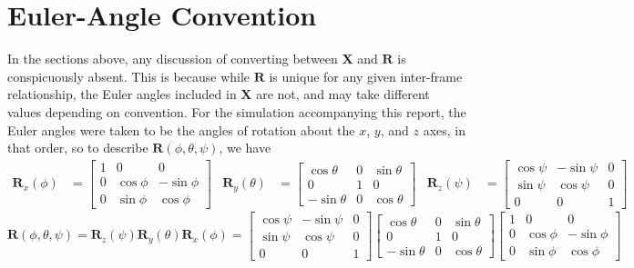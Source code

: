 \documentclass{report}
\begin{document}
		\section{Euler-Angle Convention}
			In the sections above, any discussion of converting between $\mathbf{X}$ and $\mathbf{R}$ is conspicuously absent. This is because while $\mathbf{R}$ is unique for any given inter-frame relationship, the Euler angles included in $\mathbf{X}$ are not, and may take different values depending on convention. For the simulation accompanying this report, the Euler angles were taken to be the angles of rotation about the $x$, $y$, and $z$ axes, in that order, so to describe $\mathbf{R}(\phi, \theta, \psi)$, we have
			\begin{align}
				\mathbf{R}_x(\phi)&=\begin{bmatrix}
					1 & 0 & 0 \\
					0 & \cos\phi & -\sin\phi \\
					0 & \sin\phi & \cos\phi
				\end{bmatrix} & 
				\mathbf{R}_y(\theta)&=\begin{bmatrix}
					\cos\theta & 0 & \sin\theta \\
					0 & 1 & 0 \\
					-\sin\theta & 0 & \cos\theta
				\end{bmatrix} &
				\mathbf{R}_z(\psi)&=\begin{bmatrix}
					\cos\psi & -\sin\psi & 0 \\
					\sin\psi & \cos\psi & 0 \\
					0 & 0 & 1
				\end{bmatrix}
			\end{align}
			\begin{equation}
				\mathbf{R}(\phi,\theta,\psi)=\mathbf{R}_z(\psi)\mathbf{R}_y(\theta)\mathbf{R}_x(\phi)=\begin{bmatrix}
					\cos\psi & -\sin\psi & 0 \\
					\sin\psi & \cos\psi & 0 \\
					0 & 0 & 1
				\end{bmatrix}\begin{bmatrix}
					\cos\theta & 0 & \sin\theta \\
					0 & 1 & 0 \\
					-\sin\theta & 0 & \cos\theta
				\end{bmatrix}\begin{bmatrix}
					1 & 0 & 0 \\
					0 & \cos\phi & -\sin\phi \\
					0 & \sin\phi & \cos\phi
				\end{bmatrix}
			\end{equation}
\end{document}
